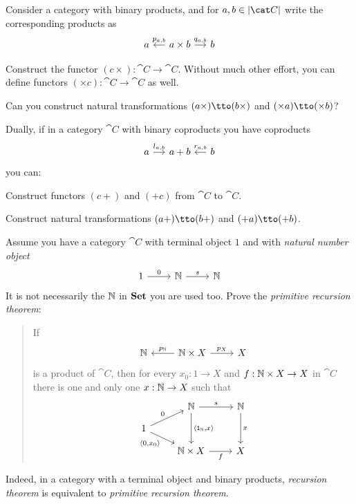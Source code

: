 \begin{exercise}
Consider a category with binary products, and for \(a, b \in \obj{\cat C}\) write the corresponding products as
\[\begin{tikzcd}[column sep=small]
a & a \times b \ar["{p_{a,b}}", l, swap] \ar["{q_{a,b}}", r] & b
\end{tikzcd}\]
\begin{tcbenum}
\item Construct the functor \((c \times) : \cat C \to \cat C\). Without much other effort, you can define functors \((\times c) : \cat C \to \cat C\) as well.
\item Can you construct natural transformations \((a \times) \tto (b \times)\) and \((\times a) \tto (\times b)\)?
\end{tcbenum}
Dually, if in a category \(\cat C\) with binary coproducts you have coproducts
\[\begin{tikzcd}[column sep=small]
a \ar["{l_{a,b}}", r] & a+b & b \ar["{r_{a,b}}", l, swap]
\end{tikzcd}\]
you can:
\begin{tcbenum}
\item Construct functors \((c +)\) and \((+ c)\) from \(\cat C\) to \(\cat C\).
\item Construct natural transformations \((a +) \tto (b +)\) and \((+ a) \tto (+ b)\).
\end{tcbenum}
\end{exercise}

\begin{exercise}
Assume you have a category \(\cat C\) with terminal object \(1\) and with {\em natural number object}
\[\begin{tikzcd}
1 \ar["0", r] & \naturals \ar["s", r] & \naturals
\end{tikzcd}\]
It is not necessarily the \(\mathbb N\) in \(\mathbf{Set}\) you are used too. Prove the {\em primitive recursion theorem}:
\begin{quotation}
If
\[\begin{tikzcd}
\naturals & \naturals \times X \ar["{p_\naturals}", l, swap] \ar["{p_X}", r] & X
\end{tikzcd}\]
is a product of \(\cat C\), then for every \(x_0 : 1 \to X\) and \(f : \mathbb N \times X \to X\) in \(\cat C\) there is one and only one \(x : \mathbb N \to X\) such that
\[\begin{tikzcd}[row sep=small]
& \naturals \ar["s", r] \ar["{\angled{\id_\naturals, x}}", dd] & \naturals \ar["x", dd] \\
1 \ar["0", ur] \ar["{\angled{0, x_0}}", dr, swap] \\
& \naturals \times X \ar["f", r, swap] & X
\end{tikzcd}\]
\end{quotation}
Indeed, in a category with a terminal object and binary products, {\em recursion theorem} is equivalent to {\em primitive recursion theorem}. 
\end{exercise}

